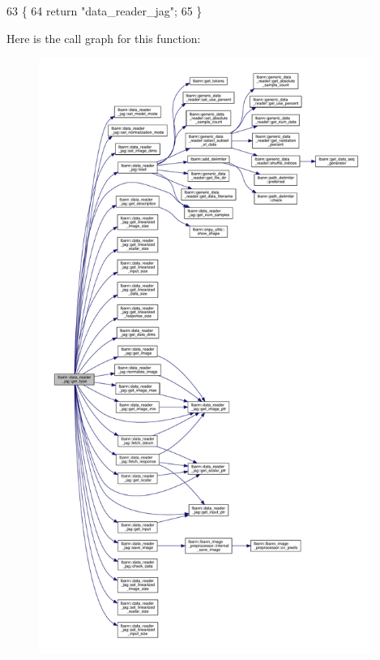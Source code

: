 \begin{DoxyCode}
63                                       \{
64     \textcolor{keywordflow}{return} \textcolor{stringliteral}{"data\_reader\_jag"};
65   \}
\end{DoxyCode}
Here is the call graph for this function\+:\nopagebreak
\begin{figure}[H]
\begin{center}
\leavevmode
\includegraphics[height=550pt]{classlbann_1_1data__reader__jag_ae3f45a65894cb60343676d75a8b7f99c_cgraph}
\end{center}
\end{figure}
\mbox{\label{classlbann_1_1data__reader__jag_a1a5c6cbbaba03f9826cbbd7657427351}} 
